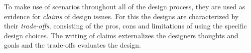 \begin{method} \label{meth:trade-offs_and_claims} 
  To make use of scenarios throughout all of the design process, they are used as evidence for \emph{claims} of design issues. For this the designs are characterized by their \emph{trade-offs}, consisting of the pros, cons and limitations of using the specific design choices. The writing of claims externalizes the designers thoughts and goals and the trade-offs evaluates the design. \cite[p. 69]{benyon14}
\end{method}